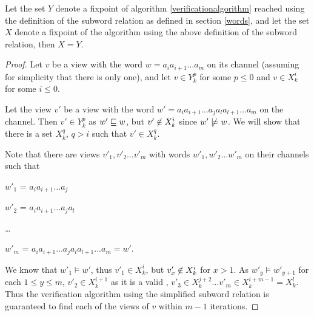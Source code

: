 \begin{lemma}
Let the set $Y$ denote a fixpoint of algorithm \ref{verificationalgorithm} reached using the definition of the subword relation as defined in section \ref{words}, and let the set $X$ denote a fixpoint of the algorithm using the above definition of the subword relation, then $X=Y$.
\end{lemma}
\begin{proof}
Let $v$ be a view with the word $w = a_ia_{i+1}\ldots a_m$ on its channel (assuming for simplicity that there is only one), and let $v\in Y_k^p$ for some $p \leq 0$ and $v\in X_k^i$ for some $i \leq 0$.

Let the view $v'$ be a view with the word $w' = a_ia_{i+1}\ldots a_ja_la_{l+1}\ldots a_m$ on the channel. Then $v' \in Y_k^p$ as $w' \sqsubseteq w$, but $v' \centernot\in X_k^i$ since $w' \centernot\models w$. We will show that there is a set $X_k^q$, $q > i$ such that $v'\in X_k^q$.


Note that there are views $v'_1, v'_2\ldots v'_m$ with words $w'_1, w'_2\ldots w'_m$ on their channels such that

\hspace{10mm}
$w'_1$ =  $a_ia_{i+1}\ldots a_j$

\hspace{10mm}
$w'_2$ = $a_ia_{i+1}\ldots a_ja_l$

\hspace{10mm}
\ldots

\hspace{10mm}
$w'_{m}$ = $a_ia_{i+1}\ldots a_ja_la_{l+1}\ldots a_{m} = w'$.

We know that $w'_1 \models w'$, thus $v'_1 \in X_k^{i}$, but $v'_x \centernot\in X_k^i$ for $x > 1$. As $w'_y \models w'_{y+1}$ for each $1 \leq y \leq m$, $v'_2 \in X_k^{i+1}$ as it is a valid , $v'_3 \in X_k^{j+2} \ldots v'_m \in X_k^{i+m-1} = X_k^l$. Thus the verification algorithm using the simplified subword relation is guaranteed to find each of the views of $v$ within $m-1$ iterations.

\end{proof}


